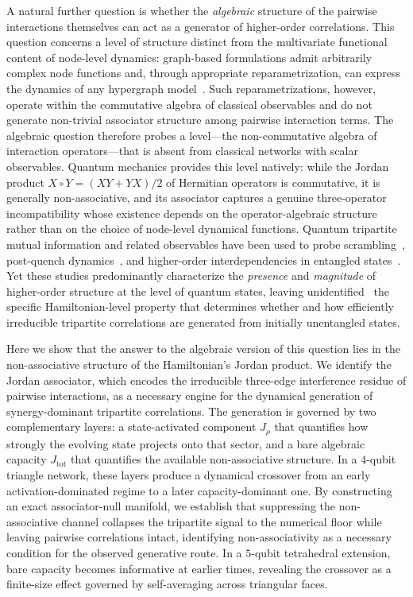 \documentclass[aps,physrev,preprint,groupedaddress]{revtex4-2}
\begin{document}
A natural further question is whether the \emph{algebraic} structure of the pairwise interactions themselves can act as a generator of higher-order correlations. This question concerns a level of structure distinct from the multivariate functional content of node-level dynamics: graph-based formulations admit arbitrarily complex node functions and, through appropriate reparametrization, can express the dynamics of any hypergraph model~\cite{peixoto2026GraphsAre}. Such reparametrizations, however, operate within the commutative algebra of classical observables and do not generate non-trivial associator structure among pairwise interaction terms. The algebraic question therefore probes a level---the non-commutative algebra of interaction operators---that is absent from classical networks with scalar observables. Quantum mechanics provides this level natively: while the Jordan product $X \circ Y = (XY+YX)/2$ of Hermitian operators is commutative, it is generally non-associative, and its associator captures a genuine three-operator incompatibility whose existence depends on the operator-algebraic structure rather than on the choice of node-level dynamical functions. Quantum tripartite mutual information and related observables have been used to probe scrambling~\cite{hosur2016ChaosQuantum, sur2022InformationScrambling, maldacena2016BoundChaos}, post-quench dynamics~\cite{caceffo2023NegativeTripartite}, and higher-order interdependencies in entangled states~\cite{javarone2024QuantifyingHighorder}. Yet these studies predominantly characterize the \emph{presence} and \emph{magnitude} of higher-order structure at the level of quantum states, leaving unidentified~\cite{javarone2024QuantifyingHighorder} the specific Hamiltonian-level property that determines whether and how efficiently irreducible tripartite correlations are generated from initially unentangled states.

Here we show that the answer to the algebraic version of this question lies in the non-associative structure of the Hamiltonian's Jordan product. We identify the Jordan associator, which encodes the irreducible three-edge interference residue of pairwise interactions, as a necessary engine for the dynamical generation of synergy-dominant tripartite correlations. The generation is governed by two complementary layers: a state-activated component $J_\rho$ that quantifies how strongly the evolving state projects onto that sector, and a bare algebraic capacity  $J_{\mathrm{tot}}$ that quantifies the available non-associative structure. In a $4$-qubit triangle network, these layers produce a dynamical crossover from an early activation-dominated regime to a later capacity-dominant one. By constructing an exact associator-null manifold, we establish that suppressing the non-associative channel collapses the tripartite signal to the numerical floor while leaving pairwise correlations intact, identifying non-associativity as a necessary condition for the observed generative route. In a $5$-qubit tetrahedral extension, bare capacity becomes informative at earlier times, revealing the crossover as a finite-size effect governed by self-averaging across triangular faces.
\end{document}
